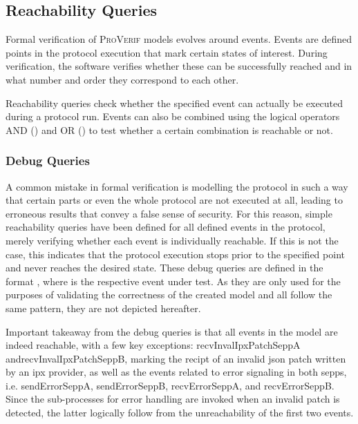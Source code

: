 \subsection{Reachability Queries}

Formal verification of \textsc{ProVerif} models evolves around events.
Events are defined points in the protocol execution that mark certain states of interest.
During verification, the software verifies whether these can be successfully reached and in what number and order they correspond to each other.

Reachability queries check whether the specified event can actually be executed during a protocol run.
Events can also be combined using the logical operators AND ({\sffamily{\&\&}}) and OR ({\sffamily{||}}) to test whether a certain combination is reachable or not.

\subsubsection{Debug Queries}
\label{ssec:debug}

A common mistake in formal verification is modelling the protocol in such a way that certain parts or even the whole protocol are not executed at all, leading to erroneous results that convey a false sense of security.
For this reason, simple reachability queries have been defined for all defined events in the protocol, merely verifying whether each event is individually reachable.
If this is not the case, this indicates that the protocol execution stops prior to the specified point and never reaches the desired state.
These debug queries are defined in the format {}, where {} is the respective event under test.
As they are only used for the purposes of validating the correctness of the created model and all follow the same pattern, they are not depicted hereafter.

Important takeaway from the debug queries is that all events in the model are indeed reachable, with a few key exceptions: {\sffamily recvInvalIpxPatchSeppA} and{\sffamily recvInvalIpxPatchSeppB}, marking the recipt of an invalid \gls{json} patch written by an \gls{ipx} provider, as well as the events related to error signaling in both \glspl{sepp}, i.e. {\sffamily sendErrorSeppA}, {\sffamily sendErrorSeppB}, {\sffamily recvErrorSeppA}, and {\sffamily recvErrorSeppB}.
Since the sub-processes for error handling are invoked when an invalid patch is detected, the latter logically follow from the unreachability of the first two events.

